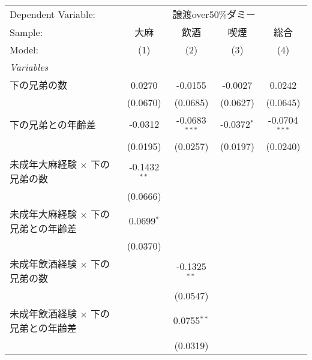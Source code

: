 \documentclass{article}
\begin{document}
\begin{landscape}


\begingroup
\centering
\begin{threeparttable}[b]
   \begin{tabular}{lcccc}
      \tabularnewline \midrule \midrule
      Dependent Variable: & \multicolumn{4}{c}{譲渡over50\%ダミー}\\
      Sample:                                             & 大麻           & 飲酒            & 喫煙          & 総合 \\   
      Model:                                              & (1)            & (2)             & (3)           & (4)\\  
      \midrule
      \emph{Variables}\\
      下の兄弟の数                                        & 0.0270         & -0.0155         & -0.0027       & 0.0242\\   
                                                          & (0.0670)       & (0.0685)        & (0.0627)      & (0.0645)\\   
      下の兄弟との年齢差                                  & -0.0312        & -0.0683$^{***}$ & -0.0372$^{*}$ & -0.0704$^{***}$\\   
                                                          & (0.0195)       & (0.0257)        & (0.0197)      & (0.0240)\\   
      未成年大麻経験 $\times$ 下の兄弟の数                & -0.1432$^{**}$ &                 &               &   \\   
                                                          & (0.0666)       &                 &               &   \\   
      未成年大麻経験 $\times$ 下の兄弟との年齢差          & 0.0699$^{*}$   &                 &               &   \\   
                                                          & (0.0370)       &                 &               &   \\   
      未成年飲酒経験 $\times$ 下の兄弟の数                &                & -0.1325$^{**}$  &               &   \\   
                                                          &                & (0.0547)        &               &   \\   
      未成年飲酒経験 $\times$ 下の兄弟との年齢差          &                & 0.0755$^{**}$   &               &   \\   
                                                          &                & (0.0319)        &               &   \\   

\end{tabular}
\end{threeparttable}
\end{landscape}
\end{document}
